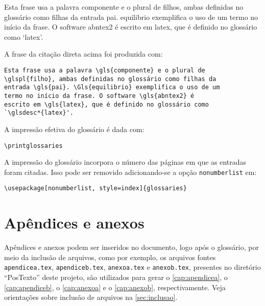 \begin{citacao}%
    Esta frase usa a palavra \gls{componente} e o plural de \glspl{filho}, ambas definidas no glossário como filhas da entrada \gls{pai}. \Gls{equilibrio} exemplifica o uso de um termo no início da frase. O software \gls{abntex2} é escrito em \gls{latex}, que é definido no glossário como `\glsdesc*{latex}'.
\end{citacao}

A frase da citação direta acima foi produzida com:

\begin{SingleSpacing}%
    \begin{verbatim}
Esta frase usa a palavra \gls{componente} e o plural de
\glspl{filho}, ambas definidas no glossário como filhas da
entrada \gls{pai}. \Gls{equilibrio} exemplifica o uso de um
termo no início da frase. O software \gls{abntex2} é
escrito em \gls{latex}, que é definido no glossário como
`\glsdesc*{latex}'.
\end{verbatim}
\end{SingleSpacing}

A impressão efetiva do glossário é dada com:

\begin{SingleSpacing}%
    \begin{verbatim}
\printglossaries
\end{verbatim}
\end{SingleSpacing}

A impressão do glossário incorpora o número das páginas em que as entradas foram citadas. Isso pode ser removido adicionando-se a opção \texttt{nonumberlist} em:

\begin{SingleSpacing}%
    \begin{verbatim}
\usepackage[nonumberlist, style=index]{glossaries}
\end{verbatim}
\end{SingleSpacing}

\section{Apêndices e anexos}\label{sec:apendiceseanexos}

Apêndices e anexos podem ser inseridos no documento, logo após o glossário, por meio da inclusão de arquivos, como por exemplo, os arquivos fontes \texttt{apendicea.tex}, \texttt{apendiceb.tex}, \texttt{anexoa.tex} e \texttt{anexob.tex}, presentes no diretório ``PosTexto'' deste projeto, são utilizados para gerar o \autoref{cap:apendicea}, o \autoref{cap:apendiceb}, o \autoref{cap:anexoa} e o \autoref{cap:anexob}, respectivamente. Veja orientações sobre inclusão de arquivos na \autoref{sec:inclusao}.

